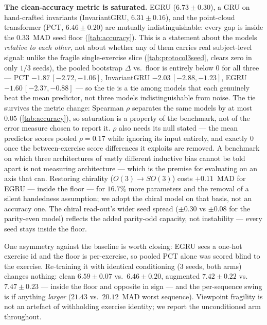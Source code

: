 \documentclass[10pt,twocolumn,letterpaper]{article}
\begin{document}
\textbf{The clean-accuracy metric is saturated.} EGRU ($6.73\pm0.30$), a GRU on hand-crafted invariants
(InvariantGRU, $6.31\pm0.16$), and the point-cloud transformer (PCT, $6.46\pm0.20$) are mutually
indistinguishable: every gap is inside the $0.33$~MAD seed floor (\cref{tab:accuracy}). This is a
statement about the models \emph{relative to each other}, not about whether any of them carries real
subject-level signal: unlike the fragile single-exercise slice (\cref{tab:protocol3seed}, clears zero in
only $1/3$ seeds), the pooled bootstrap $\Delta$ vs.\ floor is entirely below $0$ for all three
--- PCT $-1.87\,[-2.72,-1.06]$, InvariantGRU $-2.03\,[-2.88,-1.23]$, EGRU $-1.60\,[-2.37,-0.88]$
--- so the tie is a tie among models that each genuinely beat the mean predictor, not three models
indistinguishable from noise. The tie survives the metric change: Spearman $\rho$ separates the same
models by at most $0.05$ (\cref{tab:accuracy}), so saturation is a property of the benchmark, not of
the error measure chosen to report it. $\rho$ also needs its null stated --- the mean predictor scores
pooled $\rho=0.17$ while ignoring its input entirely, and exactly $0$ once the between-exercise
score differences it exploits are removed. A benchmark on
which three architectures of vastly different inductive bias cannot be told apart is not measuring
architecture --- which is the premise for evaluating on an axis that can. Restoring
chirality ($O(3)\!\to\!SO(3)$) costs $+0.11$~MAD for EGRU --- inside the floor --- for $16.7\%$ more
parameters and the removal of a silent handedness assumption; we adopt the chiral model on that basis,
not an accuracy one. The chiral read-out's wider seed spread ($\pm0.30$ vs $\pm0.08$ for the parity-even
model) reflects the added parity-odd capacity, not instability --- every seed stays inside the floor.

One asymmetry against the baseline is worth closing: EGRU sees a one-hot exercise id and the floor is
per-exercise, so pooled PCT alone was scored blind to the exercise. Re-training it with identical
conditioning (3 seeds, both arms) changes nothing: clean $6.59\pm0.07$ vs.\ $6.46\pm0.20$, augmented
$7.42\pm0.22$ vs.\ $7.47\pm0.23$ --- inside the floor and opposite in sign --- and the per-sequence
swing is if anything \emph{larger} ($21.43$ vs.\ $20.12$~MAD worst sequence). Viewpoint fragility is not
an artefact of withholding exercise identity; we report the unconditioned arm throughout.
\end{document}
